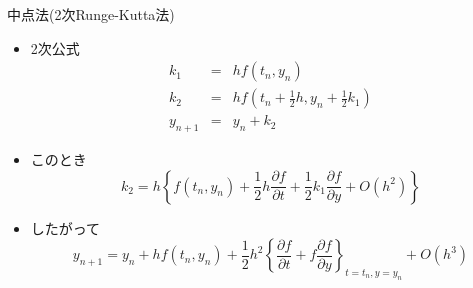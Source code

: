 \begin{frame}[t,fragile]{中点法(2次Runge-Kutta法)}
  \begin{itemize}
  \item 2次公式
    \[
    \begin{array}{rcl}
      k_1 & = & h f(t_n, y_n) \\
      k_2 & = & h f(t_n + \frac{1}{2}h, y_n + \frac{1}{2}k_1) \\
      y_{n+1} & = & y_n + k_2
    \end{array}
    \]
  \item このとき
    \[
    k_2 = h 
    \left\{
    f(t_n, y_n)
    + \frac{1}{2}h \frac{\partial f}{\partial t}
    + \frac{1}{2}k_1 \frac{\partial f}{\partial y}
    + O(h^2)
    \right\}
    \]
  \item したがって
    \[
    y_{n+1} = y_n + h f(t_n, y_n) + \frac{1}{2}h^2
    \left\{
    \frac{\partial f}{\partial t}
    + f \frac{\partial f}{\partial y}
    \right\}_{t=t_n, y=y_n}
    \!\!\!\!\!\!\!\!\!\!\!\!+ O(h^3)
    \]
  \end{itemize}
\end{frame}
